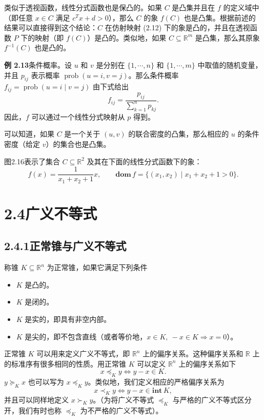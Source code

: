 \documentclass[UTF8,12pt,a4paper,fontset=fandol]{ctexart}
\begin{document}
类似于透视函数，线性分式函数也是保凸的。如果 $C$ 是凸集并且在 $f$ 的定义域中（即任意 $x\in C$ 满足 $c^Tx+d>0$），那么 $C$ 的象 $f(C)$ 也是凸集。根据前述的结果可以直接得到这个结论：$C$ 在仿射映射 (2.12) 下的象是凸的，并且在透视函数 $P$ 下的映射（即 $f(C)$）是凸的。类似地，如果 $C\subseteq\mathbb{R}^m$ 是凸集，那么其原象 $f^{-1}(C)$ 也是凸的。

\noindent\textbf{例 2.13}\quad 条件概率。设 $u$ 和 $v$ 是分别在 $\{1,\cdots,n\}$ 和 $\{1,\cdots,m\}$ 中取值的随机变量，并且 $p_{ij}$ 表示概率 $\operatorname{prob}(u=i,v=j)$。那么条件概率 $f_{ij}=\operatorname{prob}(u=i\mid v=j)$ 由下式给出
\[
  f_{ij}=\frac{p_{ij}}{\sum_{k=1}^n p_{kj}}.
\]
因此，$f$ 可以通过一个线性分式映射从 $p$ 得到。

可以知道，如果 $C$ 是一个关于 $(u,v)$ 的联合密度的凸集，那么相应的 $u$ 的条件密度（给定 $v$）的集合也是凸集。

图2.16表示了集合 $C\subseteq\mathbb{R}^2$ 及其在下面的线性分式函数下的象：
\[
  f(x)=\frac{1}{x_1+x_2+1}x,\qquad
  \mathbf{dom}\,f=\{(x_1,x_2)\mid x_1+x_2+1>0\}.
\]

\section*{2.4\quad 广义不等式}

\subsection*{2.4.1\quad 正常锥与广义不等式}

称锥 $K\subseteq\mathbb{R}^n$ 为正常锥，如果它满足下列条件
\begin{itemize}
  \item $K$ 是凸的。
  \item $K$ 是闭的。
  \item $K$ 是实的，即具有非空内部。
  \item $K$ 是尖的，即不包含直线（或者等价地，$x\in K,\ -x\in K\Longrightarrow x=0$）。
\end{itemize}
正常锥 $K$ 可以用来定义广义不等式，即 $\mathbb{R}^n$ 上的偏序关系。这种偏序关系和 $\mathbb{R}$ 上的标准序有很多相同的性质。用正常锥 $K$ 可以定义 $\mathbb{R}^n$ 上的偏序关系如下
\[
  x\preceq_K y\Longleftrightarrow y-x\in K.
\]
$y\succeq_K x$ 也可以写为 $x\preceq_K y$。类似地，我们定义相应的严格偏序关系为
\[
  x\prec_K y\Longleftrightarrow y-x\in\mathbf{int}\,K,
\]
并且可以同样地定义 $x\succ_K y$。（为将广义不等式 $\preceq_K$ 与严格的广义不等式区分开，我们有时也称 $\preceq_K$ 为不严格的广义不等式）。
\end{document}
